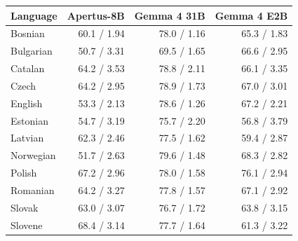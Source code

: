 \begin{tabular}{lrrr}
\toprule
Language & Apertus-8B & Gemma 4 31B & Gemma 4 E2B \\
\midrule
Bosnian & 60.1 / 1.94 & 78.0 / 1.16 & 65.3 / 1.83 \\
Bulgarian & 50.7 / 3.31 & 69.5 / 1.65 & 66.6 / 2.95 \\
Catalan & 64.2 / 3.53 & 78.8 / 2.11 & 66.1 / 3.35 \\
Czech & 64.2 / 2.95 & 78.9 / 1.73 & 67.0 / 3.01 \\
English & 53.3 / 2.13 & 78.6 / 1.26 & 67.2 / 2.21 \\
Estonian & 54.7 / 3.19 & 75.7 / 2.20 & 56.8 / 3.79 \\
Latvian & 62.3 / 2.46 & 77.5 / 1.62 & 59.4 / 2.87 \\
Norwegian & 51.7 / 2.63 & 79.6 / 1.48 & 68.3 / 2.82 \\
Polish & 67.2 / 2.96 & 78.0 / 1.58 & 76.1 / 2.94 \\
Romanian & 64.2 / 3.27 & 77.8 / 1.57 & 67.1 / 2.92 \\
Slovak & 63.0 / 3.07 & 76.7 / 1.72 & 63.8 / 3.15 \\
Slovene & 68.4 / 3.14 & 77.7 / 1.64 & 61.3 / 3.22 \\
\bottomrule
\end{tabular}

